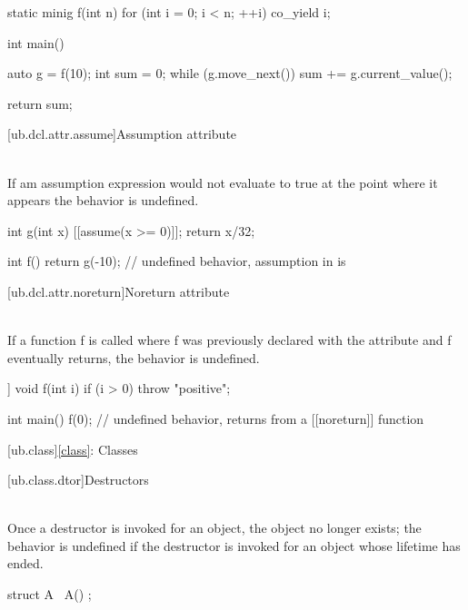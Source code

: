 {\begin{example}
\begin{codeblock}
static minig f(int n) {
  for (int i = 0; i < n; ++i)
    co_yield i;
}

int main() {
  auto g = f(10);
  int sum = 0;
  while (g.move_next())
    sum += g.current_value();

  return sum;
}
\end{codeblock}
\end{example}

[ub.dcl.attr.assume]{Assumption attribute}

\pnum
{} \\
If am assumption expression would not evaluate to true at the point where it
appears the behavior is undefined.

\pnum
\begin{example}
\begin{codeblock}
int g(int x) {
  [[assume(x >= 0)]];
  return x/32;
}

int f() {
    return g(-10);      // undefined behavior, assumption in  is 
}
\end{codeblock}
\end{example}


[ub.dcl.attr.noreturn]{Noreturn attribute}

\pnum
{} \\
If a function f is called where f was previously declared with the  attribute and f eventually returns,
the behavior is undefined.

\pnum
\begin{example}
\begin{codeblock}
[[noreturn]] void f(int i) {
  if (i > 0)
    throw "positive";
}

int main() {
  f(0);         // undefined behavior, returns from a [[noreturn]] function
}
\end{codeblock}
\end{example}


[ub.class]{\ref{class}: Classes}

[ub.class.dtor]{Destructors}

\pnum
{} \\
Once a destructor is invoked for an object, the object no longer exists; the behavior is undefined if the
destructor is invoked for an object whose lifetime has ended.

\pnum
\begin{example}
\begin{codeblock}
struct A {
  ~A() {}
};


\end{codeblock}
\end{example}}
